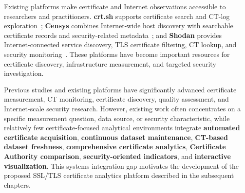Existing platforms make certificate and Internet observations accessible to
researchers and practitioners. \textbf{crt.sh} supports certificate search and
CT-log exploration~\cite{crtsh}; \textbf{Censys} combines Internet-wide host
discovery with searchable certificate records and security-related
metadata~\cite{durumeric2015censys,censyscerts}; and \textbf{Shodan} provides
Internet-connected service discovery, TLS certificate filtering, CT lookup,
and security monitoring~\cite{shodan,shodanct}. These platforms have become
important resources for certificate discovery, infrastructure measurement,
and targeted security investigation.

Previous studies and existing platforms have significantly advanced
certificate measurement, CT monitoring, certificate discovery, quality
assessment, and Internet-scale security research. However, existing work
often concentrates on a specific measurement question, data source, or
security characteristic, while relatively few certificate-focused analytical
environments integrate \textbf{automated certificate acquisition},
\textbf{continuous dataset maintenance}, \textbf{CT-based dataset freshness},
\textbf{comprehensive certificate analytics}, \textbf{Certificate Authority
comparison}, \textbf{security-oriented indicators}, and \textbf{interactive
visualization}. This systems-integration gap motivates the development of the
proposed SSL/TLS certificate analytics platform described in the subsequent
chapters.

